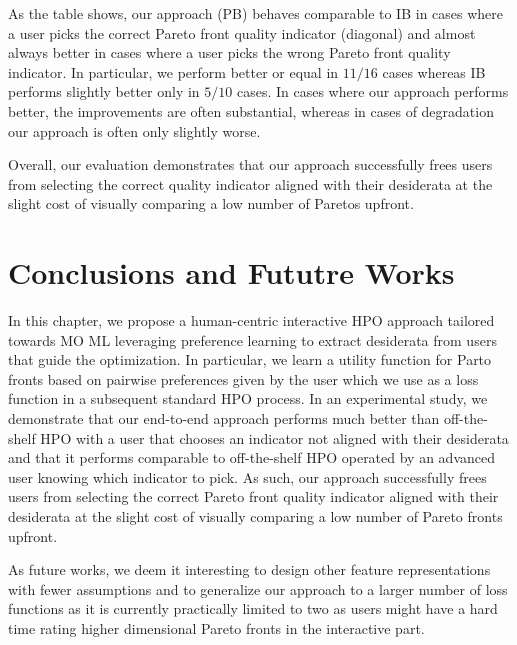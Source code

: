 As the table shows, our approach (PB) behaves comparable to IB in cases where a user picks the correct Pareto front quality indicator (diagonal) and almost always better in cases where a user picks the wrong Pareto front quality indicator. In particular, we perform better or equal in $11/16$ cases whereas IB performs slightly better only in $5/10$ cases. In cases where our approach performs better, the improvements are often substantial, whereas in cases of degradation our approach is often only slightly worse.

Overall, our evaluation demonstrates that our approach successfully frees users from selecting the correct quality indicator aligned with their desiderata at the slight cost of visually comparing a low number of Paretos upfront.

\section{Conclusions and Fututre Works}
\label{moo-sec:conclusion}
In this chapter, we propose a human-centric interactive HPO approach tailored towards MO ML leveraging preference learning to extract desiderata from users that guide the optimization. In particular, we learn a utility function for Parto fronts based on pairwise preferences given by the user which we use as a loss function in a subsequent standard HPO process. In an experimental study, we demonstrate that our end-to-end approach performs much better than off-the-shelf HPO with a user that chooses an indicator not aligned with their desiderata and that it performs comparable to off-the-shelf HPO operated by an advanced user knowing which indicator to pick. As such, our approach successfully frees users from selecting the correct Pareto front quality indicator aligned with their desiderata at the slight cost of visually comparing a low number of Pareto fronts upfront.

As future works, we deem it interesting to design other feature representations with fewer assumptions and to generalize our approach to a larger number of loss functions as it is currently practically limited to two as users might have a hard time rating higher dimensional Pareto fronts in the interactive part.

